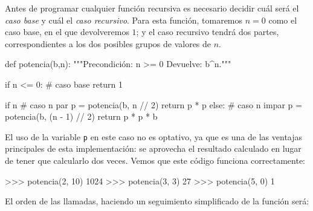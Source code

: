 Antes de programar cualquier función recursiva es necesario decidir cuál
será el \emph{caso base} y cuál el \emph{caso recursivo}.  Para esta función,
tomaremos $n=0$ como el caso base, en el que devolveremos $1$; y el caso
recursivo tendrá dos partes, correspondientes a los dos posibles grupos de
valores de $n$.

\begin{codigo-python-sn}
def potencia(b,n):
    """Precondición: n >= 0
       Devuelve: b^n."""

    if n <= 0:
        # caso base
        return 1

    if n %
        # caso n par
        p = potencia(b, n // 2)
        return p * p
    else:
        # caso n impar
        p = potencia(b, (n - 1) // 2)
        return p * p * b
\end{codigo-python-sn}

El uso de la variable \lstinline!p! en este caso no es optativo, ya que
es una de las ventajas principales de esta implementación: se aprovecha el
resultado calculado en lugar de tener que calcularlo dos veces. Vemos que
este código funciona correctamente:

\begin{codigo-python-sn}
>>> potencia(2, 10)
1024
>>> potencia(3, 3)
27
>>> potencia(5, 0)
1
\end{codigo-python-sn}

El orden de las llamadas, haciendo un seguimiento simplificado de la
función será:

